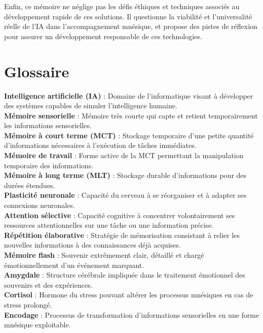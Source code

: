 \documentclass[12pt,a4paper]{report}
\begin{document}
Enfin, ce mémoire ne néglige pas les défis éthiques et techniques associés au développement rapide de ces solutions. Il questionne la viabilité et l’universalité réelle de l’IA dans l’accompagnement mnésique, et propose des pistes de réflexion pour assurer un développement responsable de ces technologies.

\tableofcontents

\listoffigures

\chapter*{Glossaire}

\textbf{Intelligence artificielle (IA)} : Domaine de l'informatique visant à développer des systèmes capables de simuler l'intelligence humaine.\\
\textbf{Mémoire sensorielle} : Mémoire très courte qui capte et retient temporairement les informations sensorielles.\\
\textbf{Mémoire à court terme (MCT)} : Stockage temporaire d'une petite quantité d'informations nécessaires à l'exécution de tâches immédiates.\\
\textbf{Mémoire de travail} : Forme active de la MCT permettant la manipulation temporaire des informations.\\
\textbf{Mémoire à long terme (MLT)} : Stockage durable d'informations pour des durées étendues.\\
\textbf{Plasticité neuronale} : Capacité du cerveau à se réorganiser et à adapter ses connexions neuronales.\\
\textbf{Attention sélective} : Capacité cognitive à concentrer volontairement ses ressources attentionnelles sur une tâche ou une information précise.\\
\textbf{Répétition élaborative} : Stratégie de mémorisation consistant à relier les nouvelles informations à des connaissances déjà acquises.\\
\textbf{Mémoire flash} : Souvenir extrêmement clair, détaillé et chargé émotionnellement d’un événement marquant.\\
\textbf{Amygdale} : Structure cérébrale impliquée dans le traitement émotionnel des souvenirs et des expériences.\\
\textbf{Cortisol} : Hormone du stress pouvant altérer les processus mnésiques en cas de stress prolongé.\\
\textbf{Encodage} : Processus de transformation d'informations sensorielles en une forme mnésique exploitable.\\
\end{document}
